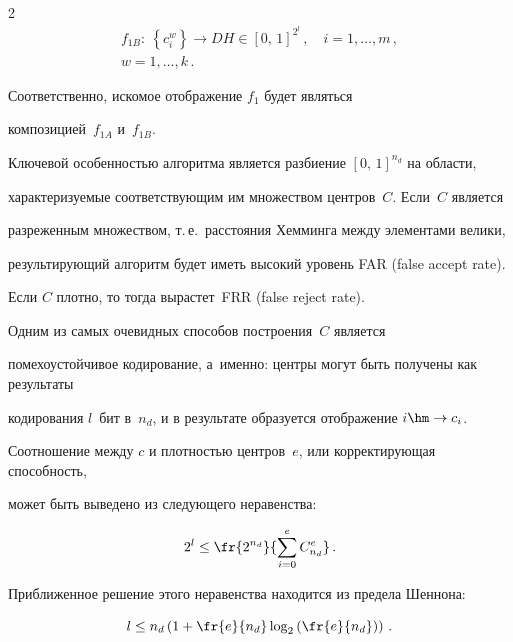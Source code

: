 \begin{multicols}{2}
\begin{multline*}
      f_{1B}:\ \left\{ c_i^w\right\}\rightarrow DH\in [0,\,1]^{2^l}\,,\quad i=1, \ldots ,m\,,\\ 

w=1,\ldots , k\,.


      \end{multline*}

      

      Соответственно, искомое отображение $f_1$ будет являться 

композицией~$f_{1A}$ и~$f_{1B}$.

      

      Ключевой особенностью алгоритма является разбиение $[0,\,1]^{n_d}$ на области, 

характеризуемые соответствующим им множеством центров~$C$. Если~$C$ является 

разреженным множеством, т.\,е.\ расстояния Хемминга между элементами велики, 

результирующий алгоритм будет иметь высокий уровень FAR (false accept rate). 

Если $C$ плот\-но, то тогда вырастет~FRR (false reject rate). 

Одним из самых очевидных способов построения~$C$ является 

помехоустойчивое кодирование, а~именно: центры могут быть получены как результаты 

кодирования $l$~бит в~$n_d$, и в результате образуется отображение $i\hm\rightarrow c_i$. 

Соотношение между $c$ и плотностью центров~$e$, или корректирующая способность, 

может быть выведено из следующего неравенства:

      \begin{equation*}

      2^l\leq \fr{2^{n_d}}{\sum\limits_{i=0}^e C^e_{n_d}}\,.


      \end{equation*}


      Приближенное решение этого неравенства находится из предела Шеннона:

      \begin{equation*}

      l\leq n_d\left( 1+\fr{e}{n_d}\log_2\left( \fr{e}{n_d}\right)\right)\,.



\end{equation*}
\end{multicols}

